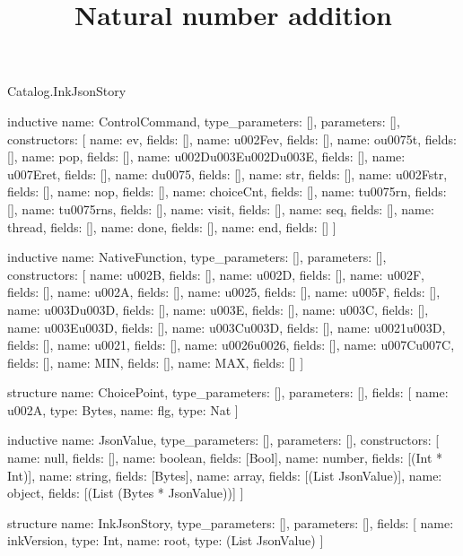 \begin{lexlean}{Catalog.InkJsonStory}
\title{Natural number addition}
\begin{semanticmodule}
inductive{
  name: ControlCommand,
  type_parameters: [],
  parameters: [],
  constructors: [
    {name: ev, fields: []},
    {name: u002Fev, fields: []},
    {name: ou0075t, fields: []},
    {name: pop, fields: []},
    {name: u002Du003Eu002Du003E, fields: []},
    {name: u007Eret, fields: []},
    {name: du0075, fields: []},
    {name: str, fields: []},
    {name: u002Fstr, fields: []},
    {name: nop, fields: []},
    {name: choiceCnt, fields: []},
    {name: tu0075rn, fields: []},
    {name: tu0075rns, fields: []},
    {name: visit, fields: []},
    {name: seq, fields: []},
    {name: thread, fields: []},
    {name: done, fields: []},
    {name: end, fields: []}
  ]
}

inductive{
  name: NativeFunction,
  type_parameters: [],
  parameters: [],
  constructors: [
    {name: u002B, fields: []},
    {name: u002D, fields: []},
    {name: u002F, fields: []},
    {name: u002A, fields: []},
    {name: u0025, fields: []},
    {name: u005F, fields: []},
    {name: u003Du003D, fields: []},
    {name: u003E, fields: []},
    {name: u003C, fields: []},
    {name: u003Eu003D, fields: []},
    {name: u003Cu003D, fields: []},
    {name: u0021u003D, fields: []},
    {name: u0021, fields: []},
    {name: u0026u0026, fields: []},
    {name: u007Cu007C, fields: []},
    {name: MIN, fields: []},
    {name: MAX, fields: []}
  ]
}

structure{
  name: ChoicePoint,
  type_parameters: [],
  parameters: [],
  fields: [
    {name: u002A, type: Bytes},
    {name: flg, type: Nat}
  ]
}

inductive{
  name: JsonValue,
  type_parameters: [],
  parameters: [],
  constructors: [
    {name: null, fields: []},
    {name: boolean, fields: [Bool]},
    {name: number, fields: [(Int * Int)]},
    {name: string, fields: [Bytes]},
    {name: array, fields: [(List JsonValue)]},
    {name: object, fields: [(List (Bytes * JsonValue))]}
  ]
}

structure{
  name: InkJsonStory,
  type_parameters: [],
  parameters: [],
  fields: [
    {name: inkVersion, type: Int},
    {name: root, type: (List JsonValue)}
  ]
}
\end{semanticmodule}
\end{lexlean}
